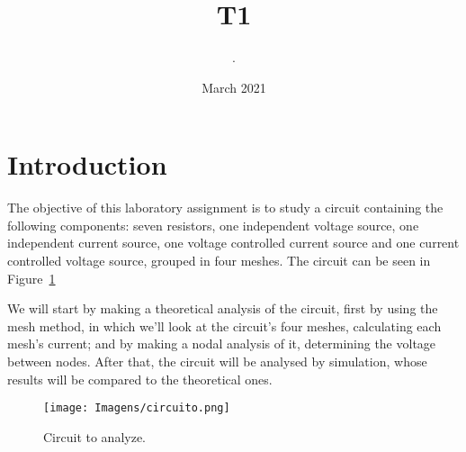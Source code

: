 \documentclass{article}
\title{T1}
\author{.}
\affil{Instituto Superior Técnico}
\date{March 2021}
\begin{document}
\maketitle

\section{Introduction}

The objective of this laboratory assignment is to study a circuit containing the following components: seven resistors, one independent voltage source, one independent current source, one voltage controlled current source and one current controlled voltage source, grouped in four meshes. The circuit can be seen in Figure~\ref{Fig1: circuit}

We will start by making a theoretical analysis of the circuit, first by  using the mesh method, in which we’ll look at the circuit’s four meshes, calculating each mesh’s current; and by making a nodal analysis of it, determining the voltage between nodes.
After that, the circuit will be analysed by simulation, whose results will be compared to the theoretical ones.

\begin{figure}[h] \centering
\texttt{[image: Imagens/circuito.png]}
\caption{Circuit to analyze.}
\label{Fig1: circuit}
\end{figure}
\end{document}
